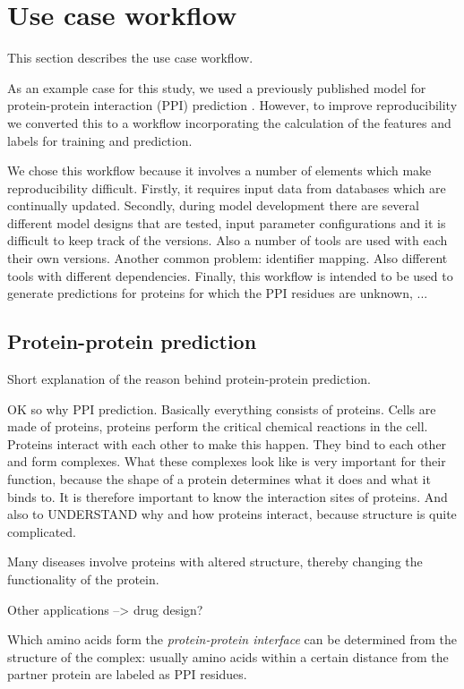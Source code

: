 \section{Use case workflow}
\label{sec:renske:workflow}

This section describes the use case workflow.

As an example case for this study, we used a previously published model for protein-protein interaction (PPI) prediction \cite{capelMultiTaskLearningLeverage2022}. However, to improve reproducibility we converted this to a workflow incorporating the calculation of the features and labels for training and prediction. 

We chose this workflow because it involves a number of elements which make reproducibility difficult. Firstly, it requires input data from databases which are continually updated. Secondly, during model development there are several different model designs that are tested, input parameter configurations and it is difficult to keep track of the versions. Also a number of tools are used with each their own versions. Another common problem: identifier mapping. Also different tools with different dependencies. Finally, this workflow is intended to be used to generate predictions for proteins for which the PPI residues are unknown, ...

\subsection{Protein-protein prediction}

Short explanation of the reason behind protein-protein prediction.

OK so why PPI prediction. Basically everything consists of proteins. Cells are made of proteins, proteins perform the critical chemical reactions in the cell. Proteins interact with each other to make this happen. They bind to each other and form complexes. What these complexes look like is very important for their function, because the shape of a protein determines what it does and what it binds to. 
It is therefore important to know the interaction sites of proteins. And also to UNDERSTAND why and how proteins interact, because structure is quite complicated.

Many diseases involve proteins with altered structure, thereby changing the functionality of the protein.

Other applications --> drug design?

Which amino acids form the \emph{protein-protein interface} can be determined from the structure of the complex: usually amino acids within a certain distance from the partner protein are labeled as PPI residues.

